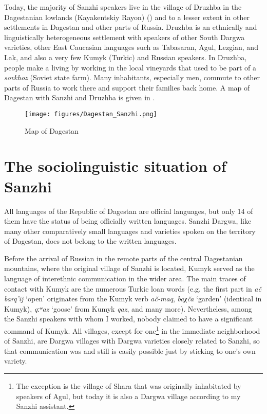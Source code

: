 Today, the majority of Sanzhi speakers live in the village of Druzhba in the Dagestanian lowlands (Kayakentskiy Rayon) () and to a lesser extent in other settlements in Dagestan and other parts of Russia. Druzhba is an ethnically and linguistically heterogeneous settlement with speakers of other South Dargwa varieties, other East Caucasian languages such as Tabasaran, Agul, Lezgian, and Lak, and also a very few Kumyk (Turkic) and Russian speakers. In Druzhba, people make a living by working in the local vineyards that used to be part of a \textit{sovkhoz} (Soviet state farm). Many inhabitants, especially men, commute to other parts of Russia to work there and support their families back home. A map of Dagestan with Sanzhi and Druzhba is given in .


\begin{figure}
	\caption{Map of Dagestan}
	\label{fig:Map 2}
	\texttt{[image: figures/Dagestan\_Sanzhi.png]}
\end{figure}


\section{The sociolinguistic situation of Sanzhi}\label{sec:The sociolinguistic situation of Sanzhi}\largerpage

All languages of the Republic of Dagestan are official languages, but only 14 of them have the status of being officially written languages. Sanzhi Dargwa, like many other comparatively small languages and varieties spoken on the territory of Dagestan, does not belong to the written languages.  

Before the arrival of Russian in the remote parts of the central Dagestanian mountains, where the original village of Sanzhi is located, Kumyk served as the language of interethnic communication in the wider area. The main traces of contact with Kumyk are the numerous Turkic loan words (e.g. the first part in \textit{ač barq'ij} `open' originates from the Kumyk verb \textit{ač-maq}, \textit{baχča} `garden' (identical in Kumyk), \textit{qːʷaz} `goose' from Kumyk \textit{qaz}, and many more). Nevertheless, among the Sanzhi speakers with whom I worked, nobody claimed to have a significant command of Kumyk. All villages, except for one\footnote{The exception is the village of Shara that was originally inhabitated by speakers of Agul, but today it is also a Dargwa village according to my Sanzhi assistant.} in the immediate neighborhood of Sanzhi, are Dargwa villages with Dargwa varieties closely related to Sanzhi, so that communication was and still is easily possible just by sticking to one's own variety.

